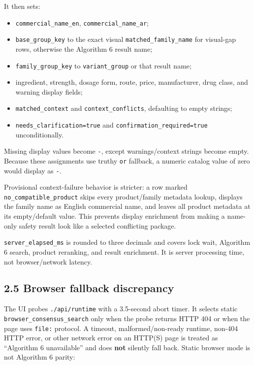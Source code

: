 It then sets:

\begin{itemize}
\tightlist
\item
  \texttt{commercial\_\allowbreak{}name\_\allowbreak{}en}, \texttt{commercial\_\allowbreak{}name\_\allowbreak{}ar};
\item
  \texttt{base\_\allowbreak{}group\_\allowbreak{}key} to the exact visual \texttt{matched\_\allowbreak{}family\_\allowbreak{}name} for visual-gap rows, otherwise the Algorithm 6 result name;
\item
  \texttt{family\_\allowbreak{}group\_\allowbreak{}key} to \texttt{variant\_\allowbreak{}group} or that result name;
\item
  ingredient, strength, dosage form, route, price, manufacturer, drug class, and warning display fields;
\item
  \texttt{matched\_\allowbreak{}context} and \texttt{context\_\allowbreak{}conflicts}, defaulting to empty strings;
\item
  \texttt{needs\_\allowbreak{}clarification=true} and \texttt{confirmation\_\allowbreak{}required=true} unconditionally.
\end{itemize}

Missing display values become \texttt{-}, except warnings/context strings become empty. Because these assignments use truthy \texttt{or} fallback, a numeric catalog value of zero would display as \texttt{-}.

Provisional context-failure behavior is stricter: a row marked \texttt{no\_\allowbreak{}compatible\_\allowbreak{}product} skips every product/family metadata lookup, displays the family name as English commercial name, and leaves all product metadata at its empty/default value. This prevents display enrichment from making a name-only safety result look like a selected conflicting package.

\texttt{server\_\allowbreak{}elapsed\_\allowbreak{}ms} is rounded to three decimals and covers lock wait, Algorithm 6 search, product reranking, and result enrichment. It is server processing time, not browser/network latency.

\subsection{2.5 Browser fallback discrepancy}\label{25-browser-fallback-discrepancy}

The UI probes \texttt{./api/runtime} with a 3.5-second abort timer. It selects static \texttt{browser\_\allowbreak{}consensus\_\allowbreak{}search} only when the probe returns HTTP 404 or when the page uses \texttt{file:} protocol. A timeout, malformed/non-ready runtime, non-404 HTTP error, or other network error on an HTTP(S) page is treated as ``Algorithm 6 unavailable'' and does \textbf{not} silently fall back. Static browser mode is not Algorithm 6 parity:

